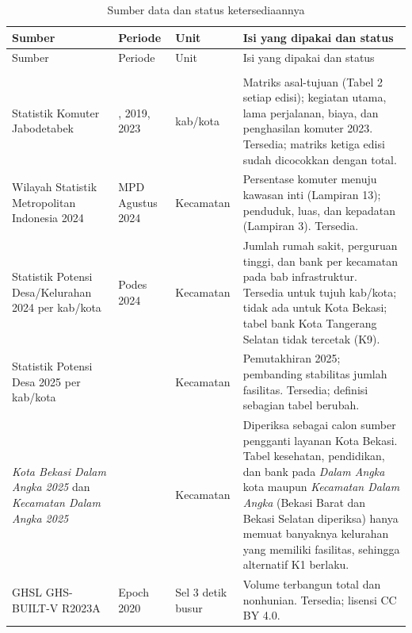 \documentclass[12pt,a4paper,oneside,openany,indonesian]{report}
\begin{document}
\begingroup
\footnotesize
\begin{longtable}{>{\raggedright\arraybackslash}p{} >{\raggedright\arraybackslash}p{} >{\raggedright\arraybackslash}p{} >{\raggedright\arraybackslash}p{}}
\caption{Sumber data dan status ketersediaannya}\label{tab:bab3-sumber}\\
\toprule
Sumber & Periode & Unit & Isi yang dipakai dan status \\
\midrule
\endfirsthead
\toprule
Sumber & Periode & Unit & Isi yang dipakai dan status \\
\midrule
\endhead
\midrule
\multicolumn{4}{r}{\footnotesize Dilanjutkan pada halaman berikutnya}\\
\endfoot
\bottomrule
\endlastfoot
Statistik Komuter Jabodetabek \parencite{bpskomuter2014,bpskomuter2019,bpskomuter2023} & 2014, 2019, 2023 & 13 kab/kota & Matriks asal-tujuan (Tabel 2 setiap edisi); kegiatan utama, lama perjalanan, biaya, dan penghasilan komuter 2023. Tersedia; matriks ketiga edisi sudah dicocokkan dengan total. \\
Wilayah Statistik Metropolitan Indonesia 2024 \parencite{bpswsm2024} & MPD Agustus 2024 & Kecamatan & Persentase komuter menuju kawasan inti (Lampiran 13); penduduk, luas, dan kepadatan (Lampiran 3). Tersedia. \\
Statistik Potensi Desa/Kelurahan 2024 per kab/kota \parencite{bpspodeskabbogor2024,bpspodeskotabogor2024,bpspodesdepok2024,bpspodeskabbekasi2024,bpspodeskabtangerang2024,bpspodeskotatangerang2024,bpspodestangsel2024} & Podes 2024 & Kecamatan & Jumlah rumah sakit, perguruan tinggi, dan bank per kecamatan pada bab infrastruktur. Tersedia untuk tujuh kab/kota; tidak ada untuk Kota Bekasi; tabel bank Kota Tangerang Selatan tidak tercetak (K9). \\
Statistik Potensi Desa 2025 per kab/kota & 2025 & Kecamatan & Pemutakhiran 2025; pembanding stabilitas jumlah fasilitas. Tersedia; definisi sebagian tabel berubah. \\
\emph{Kota Bekasi Dalam Angka 2025} \parencite{bpskotabekasi2025} dan \emph{Kecamatan Dalam Angka 2025} & 2024 & Kecamatan & Diperiksa sebagai calon sumber pengganti layanan Kota Bekasi. Tabel kesehatan, pendidikan, dan bank pada \emph{Dalam Angka} kota maupun \emph{Kecamatan Dalam Angka} (Bekasi Barat dan Bekasi Selatan diperiksa) hanya memuat banyaknya kelurahan yang memiliki fasilitas, sehingga alternatif K1 berlaku. \\
GHSL GHS-BUILT-V R2023A \parencite{ghsl2023builtv} & Epoch 2020 & Sel 3 detik busur & Volume terbangun total dan nonhunian. Tersedia; lisensi CC BY 4.0. \\

\end{longtable}
\end{document}
